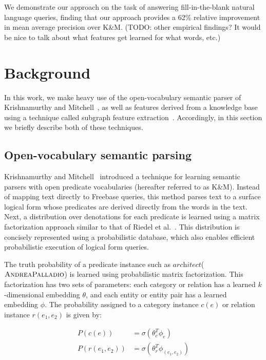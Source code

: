\documentclass[11pt]{article}
\newcommand{\lexicalpredicate}[1]{\ensuremath{\textit{#1}}}
\newcommand{\entity}[1]{\ensuremath{\textsc{#1}}}
\begin{document}
We demonstrate our approach on the task of answering fill-in-the-blank
natural language queries, finding that our approach provides a 62\%
relative improvement in mean average precision over K\&M. (TODO: other
empirical findings? It would be nice to talk about what features get
learned for what words, etc.)

\section{Background}
\label{sec:background}

In this work, we make heavy use of the open-vocabulary semantic parser
of Krishnamurthy and
Mitchell~, as
well as features derived from a knowledge base using a technique
called subgraph feature extraction~\cite[SFE]{gardner-2015-sfe}.
Accordingly, in this section we briefly describe both of these
techniques.

\subsection{Open-vocabulary semantic parsing}
\label{sec:jayant-semparse}

Krishnamurthy and
Mitchell~
introduced a technique for learning semantic parsers with open
predicate vocabularies (hereafter referred to as K\&M). Instead of
mapping text directly to Freebase queries, this method parses text to
a surface logical form whose predicates are derived directly from the
words in the text. Next, a distribution over denotations for each
predicate is learned using a matrix factorization approach similar to
that of Riedel et
al.~. This distribution is
concisely represented using a probabilistic database, which also
enables efficient probabilistic execution of logical form queries.

The truth probability of a predicate instance such as
\lexicalpredicate{architect}(\entity{AndreaPalladio}) is learned using
probabilistic matrix factorization. This factorization has two sets of
parameters: each category or relation has a learned $k$-dimensional
embedding $\theta$, and each entity or entity pair has a learned
embedding $\phi$. The probability assigned to a category instance
$c(e)$ or relation instance $r(e_1, e_2)$ is given by:

\begin{align*}
  P(c(e)) &= \sigma ( \theta_c^T \phi_e ) \\
  P(r(e_1, e_2)) &= \sigma ( \theta_r^T \phi_{(e_1, e_2)} )
\end{align*}
\end{document}
